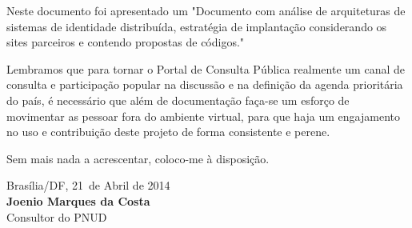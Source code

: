 \documentclass[11pt]{article}
\newcommand{\MyName}{Joenio Marques da Costa}
\newcommand{\ProductDescription}{"Documento com análise de arquiteturas de
        sistemas de identidade distribuída, estratégia de implantação
        considerando os sites parceiros e contendo propostas de códigos."
}
\newcommand{\MesEntrega}{Abril de 2014}
\newcommand{\DiaEntrega}{21}
\begin{document}
Neste documento foi apresentado um \ProductDescription

Lembramos que para tornar o Portal de Consulta Pública realmente um canal de
consulta e participação popular na discussão e na definição da agenda
prioritária do país, é necessário que além de documentação faça-se um esforço
de movimentar as pessoar fora do ambiente virtual, para que haja um
engajamento no uso e contribuição deste projeto de forma consistente e perene.



\vspace{1cm}

Sem mais nada a acrescentar, coloco-me à disposição.

\vspace{1cm}

\begin{minipage}{\textwidth}
  Brasília/DF, \DiaEntrega \ de \MesEntrega\\[1cm]
  \textbf{\MyName}\\
  \small Consultor do PNUD
\end{minipage}
\end{document}
